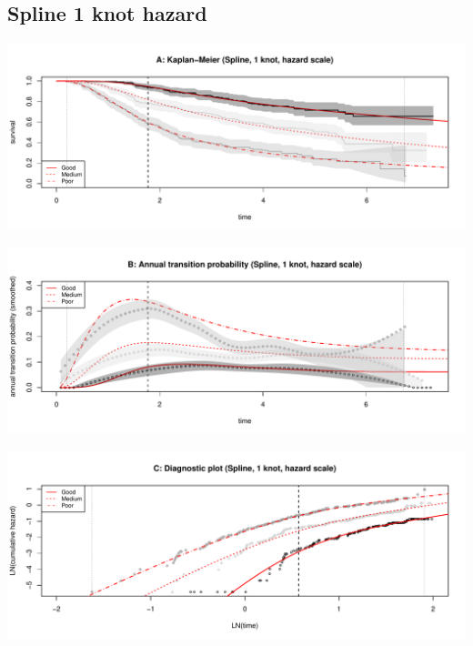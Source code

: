 \documentclass[]{article}
\begin{document}
\newpage

\subsection{Spline 1 knot hazard}\label{spline-1-knot-hazard}

\begin{flushleft}\includegraphics[height=0.25\textheight]{Images/spline_hazard1-1} \end{flushleft}

\begin{flushleft}\includegraphics[height=0.25\textheight]{Images/spline_hazard1-2} \end{flushleft}

\begin{flushleft}\includegraphics[height=0.25\textheight]{Images/spline_hazard1-3} \end{flushleft}
\end{document}
